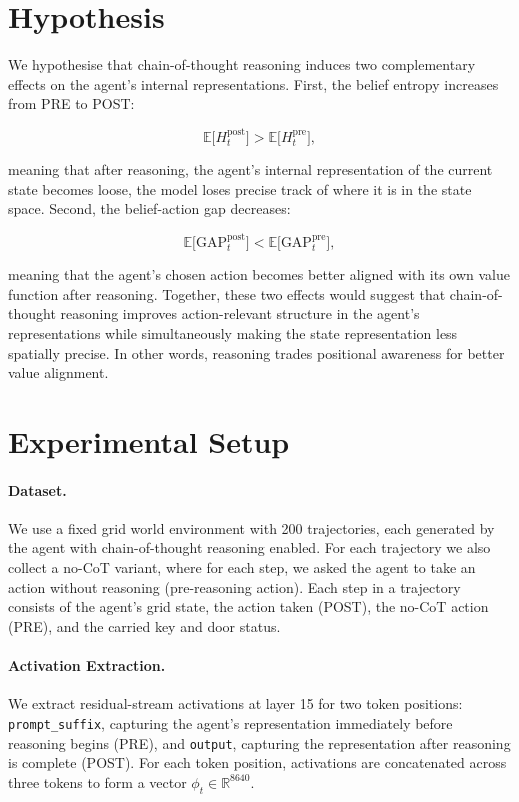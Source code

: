 \documentclass[final]{sparreport}
\begin{document}
\section{Hypothesis}

We hypothesise that chain-of-thought reasoning induces two complementary effects 
on the agent's internal representations. First, the belief entropy increases from 
PRE to POST:

\begin{equation*}
    \mathbb{E}\bigl[H_t^{\text{post}}\bigr] > \mathbb{E}\bigl[H_t^{\text{pre}}\bigr],
\end{equation*}

meaning that after reasoning, the agent's internal representation of the current 
state becomes loose, the model loses precise track of where it is in the 
state space. Second, the belief-action gap decreases:

\begin{equation*}
    \mathbb{E}\bigl[\text{GAP}_t^{\text{post}}\bigr] < \mathbb{E}\bigl[\text{GAP}_t^{\text{pre}}\bigr],
\end{equation*}

meaning that the agent's chosen action becomes better aligned with its own value 
function after reasoning. Together, these two effects would suggest that 
chain-of-thought reasoning improves action-relevant structure in the agent's 
representations while simultaneously making the state representation less 
spatially precise. In other words, reasoning trades positional awareness for 
better value alignment.



\section{Experimental Setup}

\paragraph{Dataset.}
We use a fixed grid world environment with 200 trajectories, each generated by 
the agent with chain-of-thought reasoning enabled. For each trajectory we also 
collect a no-CoT variant, where for each step, we asked the agent to take an action without reasoning (pre-reasoning action). Each step in 
a trajectory consists of the agent's grid state, the action taken (POST), the no-CoT action (PRE), and the 
carried key and door status.

\paragraph{Activation Extraction.}
We extract residual-stream activations at layer 15 for two token positions: 
\texttt{prompt\_suffix}, capturing the agent's representation immediately before 
reasoning begins (PRE), and \texttt{output}, capturing the representation after 
reasoning is complete (POST). For each token position, activations are concatenated 
across three tokens to form a vector $\phi_t \in \mathbb{R}^{8640}$.
\end{document}
